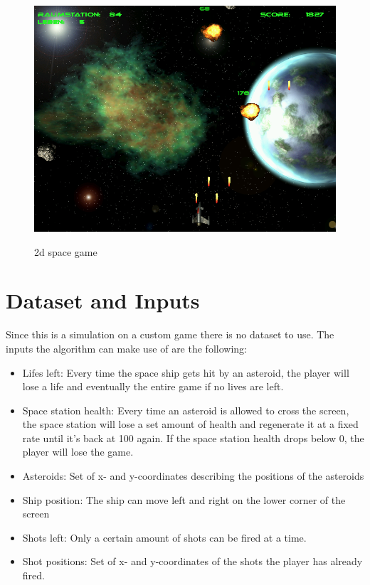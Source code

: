 \documentclass[a4paper,10pt]{article}
\begin{document}
\begin{figure}
 \centering
 \includegraphics[width=\linewidth]{game2.png}
 \label{fig:game}
 \caption{2d space game}
\end{figure}

\section{Dataset and Inputs}
% 
Since this is a simulation on a custom game there is no dataset to use.
The inputs the algorithm can make use of are the following:
\begin{itemize}
 \item Lifes left: Every time the space ship gets hit by an asteroid, the player will lose a life and eventually the entire game if no lives are left.
 \item Space station health: Every time an asteroid is allowed to cross the screen, the space station will lose a set amount of health and regenerate it at a fixed rate until it's back at 100 again. If the space station health drops below $0$, the player will lose the game.
 \item Asteroids: Set of x- and y-coordinates describing the positions of the asteroids
 \item Ship position: The ship can move left and right on the lower corner of the screen
 \item Shots left: Only a certain amount of shots can be fired at a time.
 \item Shot positions: Set of x- and y-coordinates of the shots the player has already fired.
\end{itemize}
\end{document}
